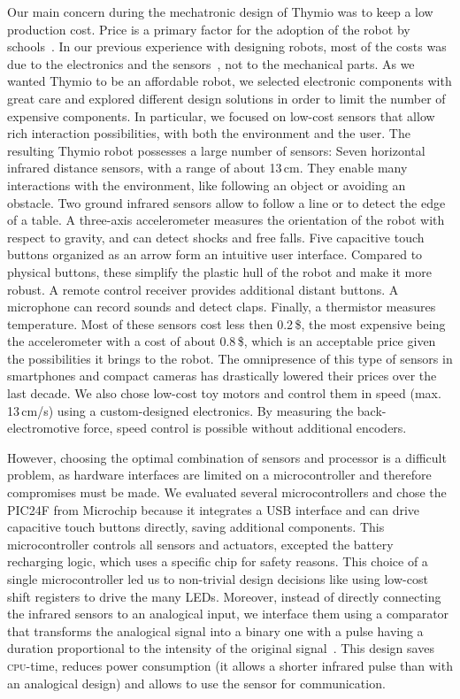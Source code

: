 \documentclass[letterpaper, 10 pt, conference]{ieeeconf}  %
\begin{document}
Our main concern during the mechatronic design of Thymio was to keep a low production cost. 
Price is a primary factor for the adoption of the robot by schools~\cite{kradolfer2014sociological}.
In our previous experience with designing robots, most of the costs was due to the electronics and the sensors~\cite{thesis_michael}, not to the mechanical parts.
As we wanted Thymio to be an affordable robot, we selected electronic components with great care and explored different design solutions in order to limit the number of expensive components.
In particular, we focused on low-cost sensors that allow rich interaction possibilities, with both the environment and the user.
The resulting Thymio robot possesses a large number of sensors:
Seven horizontal infrared distance sensors, with a range of about 13\,cm.
They enable many interactions with the environment, like following an object or avoiding an obstacle.
Two ground infrared sensors allow to follow a line or to detect the edge of a table.
A three-axis accelerometer measures the orientation of the robot with respect to gravity, and can detect shocks and free falls.
Five capacitive touch buttons organized as an arrow form an intuitive user interface.
Compared to physical buttons, these simplify the plastic hull of the robot and make it more robust.
A remote control receiver provides additional distant buttons.
A microphone can record sounds and detect claps. 
Finally, a thermistor measures temperature.
Most of these sensors cost less then 0.2\,\$, the most expensive being the accelerometer with a cost of about 0.8\,\$, which is an acceptable price given the possibilities it brings to the robot.
The omnipresence of this type of sensors in smartphones and compact cameras has drastically lowered their prices over the last decade.
We also chose low-cost toy motors and control them in speed (max. 13\,cm/s) using a custom-designed electronics.
By measuring the back-electromotive force, speed control is possible without additional encoders.

However, choosing the optimal combination of sensors and processor is a difficult problem, as hardware interfaces are limited on a microcontroller and therefore compromises must be made.
We evaluated several microcontrollers and chose the PIC24F from Microchip because it integrates a USB interface and can drive capacitive touch buttons directly, saving additional components. 
This microcontroller controls all sensors and actuators, excepted the battery recharging logic, which uses a specific chip for safety reasons.
This choice of a single microcontroller led us to non-trivial design decisions like using low-cost shift registers to drive the many LEDs.
Moreover, instead of directly connecting the infrared sensors to an analogical input, we interface them using a comparator that transforms the analogical signal into a binary one with a pulse having a duration proportional to the intensity of the original signal~\cite{wanda}. 
This design saves \textsc{cpu}-time, reduces power consumption (it allows a shorter infrared pulse than with an analogical design) and allows to use the sensor for communication.  
\end{document}
